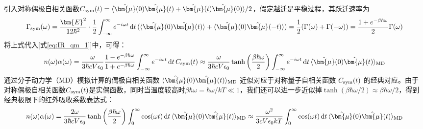 引入对称偶极自相关函数$C_{\rm{sym}}(t)=\langle\hat{\bm{\mu}}(0)\hat{\bm{\mu}}(t)+\hat{\bm{\mu}}(t)\hat{\bm{\mu}}(0)\rangle/2$，假定越迁是平稳过程，其跃迁速率为
\[\Gamma_{\rm{sym}}(\omega)=\frac{\bm{E}^2}{12\hbar^2}\cdot\frac{1}{2}\int_{-\infty}^{\infty}e^{-i\omega t}\dd{t}(\langle\hat{\bm{\mu}}(0)\hat{\bm{\mu}}(t)\rangle+\langle\hat{\bm{\mu}}(0)\hat{\bm{\mu}}(-t)\rangle)=\frac{1}{2}(\Gamma(\omega)+\Gamma(-\omega))=\frac{1+e^{-\beta\hbar\omega}}{2}\Gamma(\omega)\]
将上式代入[式\eqref{eq:IR_qm_1}]中，可得：
\[n(\omega)\alpha(\omega)=\frac{\omega}{3\hbar cV\epsilon_0}\frac{1-e^{-\beta\hbar\omega}}{1+e^{-\beta\hbar\omega}}\int_{-\infty}^{\infty}e^{-i\omega t}\dd{t}C_{\rm{sym}}(t)\approx\frac{\omega}{3\hbar cV\epsilon_0}\tanh\left(\frac{\beta\hbar\omega}{2}\right)\int_{-\infty}^{\infty}e^{-i\omega t}\dd{t}\langle\hat{\bm{\mu}}(0)\hat{\bm{\mu}}(t)\rangle_{\rm{MD}}\]
通过分子动力学（MD）模拟计算的偶极自相关函数 $\langle\hat{\bm{\mu}}(0)\hat{\bm{\mu}}(t)\rangle_{\rm{MD}}$ 近似对应于对称量子自相关函数 $C_{\rm{sym}}(t)$ 的经典对应。由于对称偶极自相关函数$C_{\rm{sym}}(t)$是实偶函数，同时当温度较高时$\beta\hbar\omega=\hbar\omega/kT\ll1$，我们还可以进一步近似掉$\tanh(\beta\hbar\omega/2)\approx\beta\hbar\omega/2$，得到经典极限下的红外吸收系数表达式：
\[n(\omega)\alpha(\omega)=\frac{2\omega}{3\hbar cV\epsilon_0}\tanh\left(\frac{\beta\hbar\omega}{2}\right)\int_{0}^{\infty}\cos(\omega t)\dd{t}\langle\hat{\bm{\mu}}(0)\hat{\bm{\mu}}(t)\rangle_{\rm{MD}}\approx\frac{\omega^2}{3cV\epsilon_0kT}\int_{0}^{\infty}\cos(\omega t)\dd{t}\langle\hat{\bm{\mu}}(0)\hat{\bm{\mu}}(t)\rangle_{\rm{MD}}\]

\newpage
